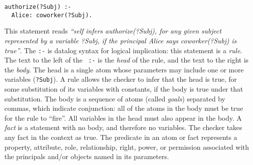 \begin{verbatim}
authorize(?Subj) :- 
  Alice: coworker(?Subj).
\end{verbatim}

This statement reads {\it ``self infers authorize(?Subj), for any given subject
represented by a variable ?Subj, if the principal Alice says
coworker(?Subj) is true''}.   The {\tt :-} is datalog syntax for logical
implication: this statement is a {\it rule}.  The text to the left of the {\tt
:-} is the {\it head} of the rule, and the text to the right is the {\it body}.
The head is a single atom whose parameters may include one or more variables
({\tt ?Subj}).  A rule allows the checker to infer that the head is true,
for some substitution of its variables with constants, if the body is true
under that substitution.  The body is a sequence of atoms (called {\it goals})
separated by commas, which indicate conjunction: all of the atoms in the body
must be true for the rule to ``fire''. All variables in the head must also
appear in the body. A {\it fact} is a statement with no body, and therefore no
variables. The checker takes any fact in the context as true.  The predicate in
an atom or fact represents a property, attribute, role, relationship, right,
power, or permission associated with the principals and/or objects named in its
parameters.

